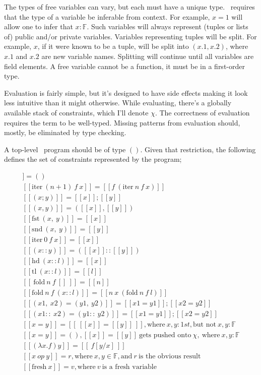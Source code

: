 \documentclass[
    9pt,            %
    techreport,        %
    affiltop,       %
]{art}
\begin{document}
The types of free variables can vary, but each must have a unique type. \VampIR{}\ requires that the type of a variable be inferable from context. For example, $x = 1$ will allow one to infer that $x : \mathbb{F}$. Such variables will always represent (tuples or lists of) public and/or private variables. Variables representing tuples will be split. For example, $x$, if it were known to be a tuple, will be split into $(x.1, x.2)$, where $x.1$ and $x.2$ are new variable names. Splitting will continue until all variables are field elements. A free variable cannot be a function, it must be in a first-order type.

Evaluation is fairly simple, but it's designed to have side effects making it look less intuitive than it might otherwise. While evaluating, there's a globally available stack of constraints, which I'll denote $\chi$. The correctness of evaluation requires the term to be well-typed. Missing patterns from evaluation should, mostly, be eliminated by type checking.

A top-level \VampIR{}\ program should be of type $()$. Given that restriction, the following defines the set of constraints represented by the program;

\begin{align*}
    [[ () ]] = ()\\
    [[ \text{iter}\ (n+1)\ f\ x ]] = [[f\ (\text{iter}\ n\ f\ x)]]\\
    [[ (x; y) ]] = [[x]]; [[y]]\\
    [[ (x, y) ]] = ([[x]], [[y]])\\
    [[ \text{fst}\ (x,\ y) ]] = [[x]] \\
    [[ \text{snd}\ (x,\ y) ]] = [[y]] \\
    [[ \text{iter}\ 0\ f\ x ]] = [[x]] \\
    [[ (x :: y) ]] = ([[x]] :: [[y]])\\
    [[ \text{hd}\ (x::l) ]] = [[x]] \\
    [[ \text{tl}\ (x::l) ]] = [[l]] \\
    [[\ \text{fold}\ n\ f\ []\ ]] = [[n]] \\
    [[ \text{fold}\ n\ f\ (x::l) ]] = [[n\ x\ (\text{fold}\ n\ f\ l)]] \\
    [[ (x1,\ x2) = (y1,\ y2) ]] = [[x1 = y1]]; [[x2 = y2]]\\
    [[ (x1::\ x2) = (y1::\ y2) ]] = [[x1 = y1]]; [[x2 = y2]]\\
    [[ x = y ]] = [[\ [[x]] = [[y]]\ ]], \text{where}\ x, y : 1st, \text{but not}\ x, y : \mathbb{F}\\ 
    [[ x = y ]] = (), [[x]] = [[y]]\ \text{gets pushed onto}\ \chi,\ \text{where}\ x, y : \mathbb{F}\\
    [[ (\lambda x. f) y ]] = [[\ f[y/x]\ ]]\\
    [[x\ op\ y]] = r, \text{where}\ x, y \in \mathbb{F}, \text{and}\ r\ \text{is the obvious result}  \\
    [[ \text{fresh}\ x ]] = v, \text{where} \ v\ \text{is a fresh variable}
\end{align*}
\end{document}

